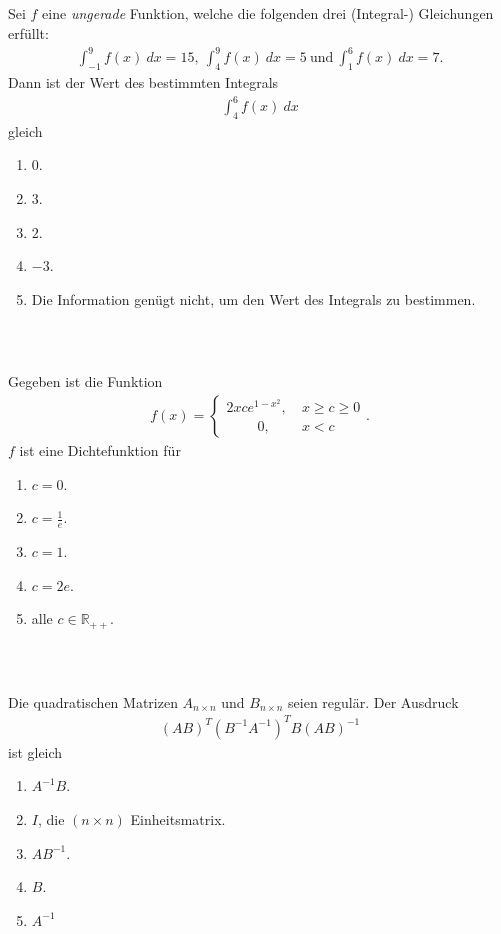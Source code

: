 \subsection*{}
Sei $ f $ eine \textit{ungerade} Funktion, welche die folgenden drei (Integral-) Gleichungen erfüllt:
\begin{align*}
	\int_{-1}^9 f(x) \ dx = 15, \
	\int_4^9 f(x) \ dx = 5 \ \textrm{und} \
	\int_1^6 f(x) \ dx = 7.
\end{align*}
Dann ist der Wert des bestimmten Integrals
\begin{align*}
	\int_4^6 f(x) \ dx
\end{align*}  
gleich
\renewcommand{\labelenumi}{(\alph{enumi})}
\begin{enumerate}
	\item 
	$ 0 $.
	\item
	$ 3 $.
	\item
	$ 2 $.
	\item
	$ -3 $.
	\item
	Die Information genügt nicht, um den Wert des Integrals zu bestimmen.
\end{enumerate}
\ \\
\subsection*{}
Gegeben ist die Funktion
\begin{align*}
f(x) =
\begin{cases}
	 2 x c e^{1 - x^2}, \ &x \geq c  \geq 0\\
 \qquad	\ 0 , \ &x < c
\end{cases}.
\end{align*}
$ f $ ist eine Dichtefunktion für
\renewcommand{\labelenumi}{(\alph{enumi})}
\begin{enumerate}
\item 
$ c = 0 $.
\item 
$ c = \frac{1}{e} $.
\item 
$ c= 1 $.
\item 
$ c = 2e $.
\item
alle $ c \in \mathbb{R}_{++} $.
\end{enumerate}
\ \\
\subsection*{}
Die quadratischen Matrizen $ A_{n \times n} $ und $ B_{n \times n} $ seien regulär.
Der Ausdruck
\begin{align*}
	(A B)^T(B^{-1} A^{-1})^T B (AB)^{-1}
\end{align*}
ist gleich
\renewcommand{\labelenumi}{(\alph{enumi})}
\begin{enumerate}
	\item 
	$ A^{-1} B $.
	\item 
	$ I $, die $ (n \times n) $ Einheitsmatrix.
	\item
	$ AB^{-1} $.
	\item
	$ B $.
	\item 
	$ A^{-1} $
\end{enumerate}
\ \\

